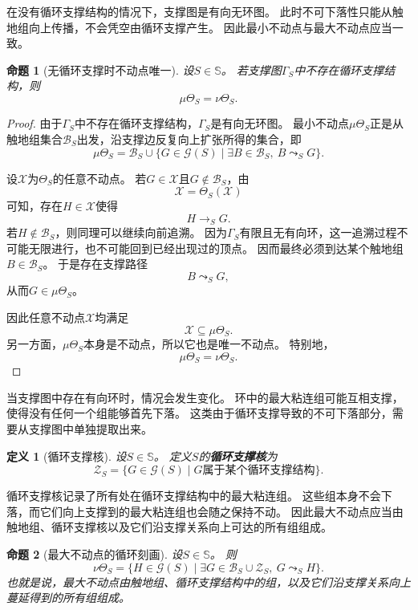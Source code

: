 \documentclass[UTF8,fontset=none]{ctexart}
\theoremstyle{cnthm}
\newtheorem{definition}{定义}[section]
\newtheorem{proposition}{命题}[section]
\begin{document}
			在没有循环支撑结构的情况下，支撑图是有向无环图。
			此时不可下落性只能从触地组向上传播，不会凭空由循环支撑产生。
			因此最小不动点与最大不动点应当一致。
			
			\begin{proposition}[无循环支撑时不动点唯一]
				设$S\in\mathbb{S}$。
				若支撑图$\Gamma_S$中不存在循环支撑结构，则
				$$
				\mu\Theta_S=\nu\Theta_S.
				$$
			\end{proposition}
			
			\begin{proof}
				由于$\Gamma_S$中不存在循环支撑结构，$\Gamma_S$是有向无环图。
				最小不动点$\mu\Theta_S$正是从触地组集合$\mathcal{B}_S$出发，沿支撑边反复向上扩张所得的集合，即
				$$
				\mu\Theta_S
				=
				\mathcal{B}_S
				\cup
				\{G\in\mathcal{G}(S)\mid \exists B\in\mathcal{B}_S,\ B\leadsto_S G\}.
				$$
				
				设$\mathcal{X}$为$\Theta_S$的任意不动点。
				若$G\in\mathcal{X}$且$G\notin\mathcal{B}_S$，由
				$$
				\mathcal{X}=\Theta_S(\mathcal{X})
				$$
				可知，存在$H\in\mathcal{X}$使得
				$$
				H\to_S G.
				$$
				若$H\notin\mathcal{B}_S$，则同理可以继续向前追溯。
				因为$\Gamma_S$有限且无有向环，这一追溯过程不可能无限进行，也不可能回到已经出现过的顶点。
				因而最终必须到达某个触地组$B\in\mathcal{B}_S$。
				于是存在支撑路径
				$$
				B\leadsto_S G,
				$$
				从而$G\in\mu\Theta_S$。
				
				因此任意不动点$\mathcal{X}$均满足
				$$
				\mathcal{X}\subseteq\mu\Theta_S.
				$$
				另一方面，$\mu\Theta_S$本身是不动点，所以它也是唯一不动点。
				特别地，
				$$
				\mu\Theta_S=\nu\Theta_S.
				$$
			\end{proof}
			
			当支撑图中存在有向环时，情况会发生变化。
			环中的最大粘连组可能互相支撑，使得没有任何一个组能够首先下落。
			这类由于循环支撑导致的不可下落部分，需要从支撑图中单独提取出来。
			
			\begin{definition}[循环支撑核]
				设$S\in\mathbb{S}$。
				定义$S$的\textbf{循环支撑核}为
				$$
				\mathcal{Z}_S
				=
				\{G\in\mathcal{G}(S)\mid G\text{属于某个循环支撑结构}\}.
				$$
			\end{definition}
			
			循环支撑核记录了所有处在循环支撑结构中的最大粘连组。
			这些组本身不会下落，而它们向上支撑到的最大粘连组也会随之保持不动。
			因此最大不动点应当由触地组、循环支撑核以及它们沿支撑关系向上可达的所有组组成。
			
			\begin{proposition}[最大不动点的循环刻画]
				设$S\in\mathbb{S}$。
				则
				$$
				\nu\Theta_S
				=
				\{H\in\mathcal{G}(S)
				\mid
				\exists G\in \mathcal{B}_S\cup \mathcal{Z}_S,\ 
				G\leadsto_S H
				\}.
				$$
				也就是说，最大不动点由触地组、循环支撑结构中的组，以及它们沿支撑关系向上蔓延得到的所有组组成。
			\end{proposition}
			
\end{document}
